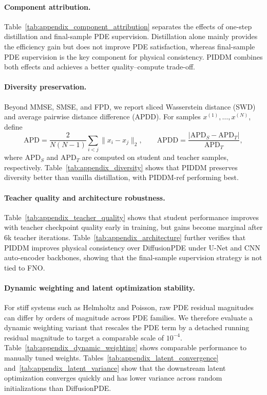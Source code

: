 \documentclass{article}
\theoremstyle{plain}
\theoremstyle{definition}
\theoremstyle{remark}
\begin{document}
\paragraph{Component attribution.} Table~\ref{tab:appendix_component_attribution} separates the effects of one-step distillation and final-sample PDE supervision. Distillation alone mainly provides the efficiency gain but does not improve PDE satisfaction, whereas final-sample PDE supervision is the key component for physical consistency. PIDDM combines both effects and achieves a better quality--compute trade-off.

\paragraph{Diversity preservation.} Beyond MMSE, SMSE, and FPD, we report sliced Wasserstein distance (SWD) and average pairwise distance difference (APDD). For samples \(x^{(1)},\ldots,x^{(N)}\), define
\[
\mathrm{APD}=\frac{2}{N(N-1)}\sum_{i<j}\|x_i-x_j\|_2,
\qquad
\mathrm{APDD}=\frac{\left|\mathrm{APD}_S-\mathrm{APD}_T\right|}{\mathrm{APD}_T},
\]
where \(\mathrm{APD}_S\) and \(\mathrm{APD}_T\) are computed on student and teacher samples, respectively. Table~\ref{tab:appendix_diversity} shows that PIDDM preserves diversity better than vanilla distillation, with PIDDM-ref performing best.

\paragraph{Teacher quality and architecture robustness.} Table~\ref{tab:appendix_teacher_quality} shows that student performance improves with teacher checkpoint quality early in training, but gains become marginal after 6k teacher iterations. Table~\ref{tab:appendix_architecture} further verifies that PIDDM improves physical consistency over DiffusionPDE under U-Net and CNN auto-encoder backbones, showing that the final-sample supervision strategy is not tied to FNO.

\paragraph{Dynamic weighting and latent optimization stability.} For stiff systems such as Helmholtz and Poisson, raw PDE residual magnitudes can differ by orders of magnitude across PDE families. We therefore evaluate a dynamic weighting variant that rescales the PDE term by a detached running residual magnitude to target a comparable scale of \(10^{-4}\). Table~\ref{tab:appendix_dynamic_weighting} shows comparable performance to manually tuned weights. Tables~\ref{tab:appendix_latent_convergence} and~\ref{tab:appendix_latent_variance} show that the downstream latent optimization converges quickly and has lower variance across random initializations than DiffusionPDE.
\end{document}
